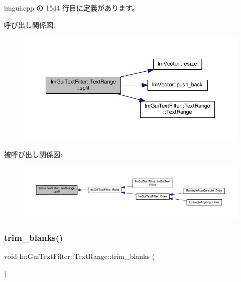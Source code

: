  imgui.\+cpp の 1544 行目に定義があります。

呼び出し関係図\+:\nopagebreak
\begin{figure}[H]
\begin{center}
\leavevmode
\includegraphics[width=350pt]{struct_im_gui_text_filter_1_1_text_range_a9e0a0d6079e10128cde4d89c04b8f566_cgraph}
\end{center}
\end{figure}
被呼び出し関係図\+:\nopagebreak
\begin{figure}[H]
\begin{center}
\leavevmode
\includegraphics[width=350pt]{struct_im_gui_text_filter_1_1_text_range_a9e0a0d6079e10128cde4d89c04b8f566_icgraph}
\end{center}
\end{figure}
\mbox{\label{struct_im_gui_text_filter_1_1_text_range_aa3bbd8b17b528f548d73c0936228dc85}} 
\subsubsection{\texorpdfstring{trim\+\_\+blanks()}{trim\_blanks()}}
{\footnotesize\ttfamily void Im\+Gui\+Text\+Filter\+::\+Text\+Range\+::trim\+\_\+blanks (\begin{DoxyParamCaption}{ }\end{DoxyParamCaption})\hspace{0.3cm}{\ttfamily [inline]}}



